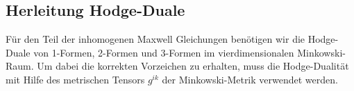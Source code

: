\begin{comment}
\vspace{1em}
\noindent
Zusätzlich gruppieren wir die Berechnungen nach der Anzahl der enthaltenen Zeitkomponenten \( dx^0 \). Dies betont die geometrische Rolle der Zeitrichtung in der Minkowski-Metrik und hilft dabei, Muster und Symmetrien leichter zu erkennen:
\begin{itemize}
	\item Bei 1-Formen unterscheiden wir zwischen rein zeitartigen (\( dx^0 \)) und rein raumartigen (\( dx^i, \, i > 0 \)) Formen.
	\item Bei 2-Formen ergeben sich drei Typen:
	\begin{itemize}
		\item Formen der Art \( dx^{0i} \), also mit einer Zeit- und einer Raumkomponente,
		\item rein raumartige Formen \( dx^{ij} \),
		\item (rein zeitartige 2-Formen wie \( dx^{00} \) sind ausgeschlossen, da \( dx^0 \wedge dx^0 = 0 \)).
	\end{itemize}
	\item Bei 3-Formen ergibt sich entsprechend eine Aufteilung in:
	\begin{itemize}
		\item zwei Raum- und eine Zeitkomponente (\( dx^{0ij} \)),
		\item rein raumartige Formen (\( dx^{ijk} \)).
	\end{itemize}
\end{itemize}

\vspace{1em}
\noindent
Mit dieser Vorbereitung können wir nun die konkreten Hodge-Dualen der Basisformen systematisch berechnen.
\end{comment}


\subsection{Herleitung Hodge-Duale}
Für den Teil der inhomogenen Maxwell Gleichungen benötigen wir die Hodge-Duale von 1-Formen, 2-Formen und 3-Formen im vierdimensionalen Minkowski-Raum.
Um dabei die korrekten Vorzeichen zu erhalten, muss die Hodge-Dualität mit Hilfe des metrischen Tensors $g^{ik}$  der Minkowski-Metrik verwendet werden.

